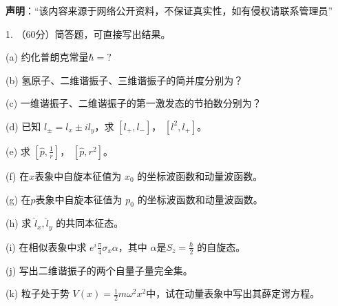 
\textbf{声明}：“该内容来源于网络公开资料，不保证真实性，如有侵权请联系管理员”

1. （60分）简答题，可直接写出结果。

(a) 约化普朗克常量$\hbar = ?$

(b) 氢原子、二维谐振子、三维谐振子的简并度分别为？

(c) 一维谐振子、二维谐振子的第一激发态的节拍数分别为？

(d) 已知 $l_\pm = l_x \pm il_y $，求 $[l_+, l_-]$， $[l^2, l_+]$。

(e) 求 $[\hat p, \frac{1}{r}]$， $[\hat p, r^2]$。

(f) 在$x$表象中自旋本征值为 $x_0$ 的坐标波函数和动量波函数。

(g) 在$p$表象中自旋本征值为 $p_0$ 的坐标波函数和动量波函数。

(h) 求 $\hat l_x,\hat l_y$ 的共同本征态。

(i) 在相似表象中求 $e^i\frac{\pi}{4}\sigma_x\alpha$，其中 $\alpha$是$S_z =\frac{\hbar}{2} $ 的自旋态。

(j) 写出二维谐振子的两个自量子量完全集。

(k) 粒子处于势 $V(x) = \frac{1}{2}m\omega^2x^2$中，试在动量表象中写出其薛定谔方程。

